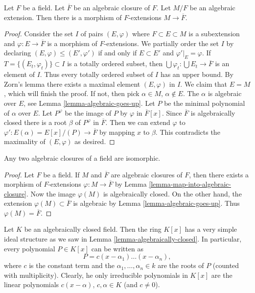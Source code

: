 \begin{lemma}
\label{lemma-map-into-algebraic-closure}
Let $F$ be a field. Let $\overline{F}$ be an algebraic closure of $F$.
Let $M/F$ be an algebraic extension. Then there is a morphism of
$F$-extensions $M \to \overline{F}$.
\end{lemma}

\begin{proof}
Consider the set $I$ of pairs $(E, \varphi)$ where $F \subset E \subset M$
is a subextension and $\varphi : E \to \overline{F}$ is a morphism of
$F$-extensions. We partially order the set $I$ by declaring
$(E, \varphi) \leq (E', \varphi')$ if and only if $E \subset E'$ and
$\varphi'|_E = \varphi$. If $T = \{(E_t,  \varphi_t)\} \subset I$
is a totally ordered subset, then
$\bigcup \varphi_t : \bigcup E_t \to \overline{F}$ is an element of $I$.
Thus every totally ordered subset of $I$ has an upper bound.
By Zorn's lemma there exists a maximal element $(E, \varphi)$ in $I$.
We claim that $E = M$, which will finish the proof. If not, then
pick $\alpha \in M$, $\alpha \not \in E$. The $\alpha$ is algebraic
over $E$, see Lemma \ref{lemma-algebraic-goes-up}.
Let $P$ be the minimal polynomial of $\alpha$ over $E$.
Let $P^\varphi$ be the image of $P$ by $\varphi$ in $\overline{F}[x]$.
Since $\overline{F}$ is algebraically closed there is a root $\beta$
of $P^\varphi$ in $\overline{F}$. Then we can extend $\varphi$ to
$\varphi' : E(\alpha) = E[x]/(P) \to \overline{F}$ by mapping
$x$ to $\beta$. This contradicts the maximality of $(E, \varphi)$
as desired.
\end{proof}

\begin{lemma}
\label{lemma-algebraic-closures-isomorphic}
Any two algebraic closures of a field are isomorphic.
\end{lemma}

\begin{proof}
Let $F$ be a field. If $M$ and $\overline{F}$ are algebraic closures of
$F$, then there exists a morphism of $F$-extensions
$\varphi : M \to \overline{F}$ by
Lemma \ref{lemma-map-into-algebraic-closure}.
Now the image $\varphi(M)$ is algebraically closed.
On the other hand, the extension $\varphi(M) \subset \overline{F}$
is algebraic by Lemma \ref{lemma-algebraic-goes-up}.
Thus $\varphi(M) = \overline{F}$.
\end{proof}

\noindent
Let $K$ be an algebraically closed field. Then the ring $K[x]$ has a very
simple ideal structure as we saw in Lemma \ref{lemma-algebraically-closed}.
In particular, every polynomial $P \in K[x]$ can be written as
$$
P = c(x - \alpha_1) \ldots (x - \alpha_n),
$$
where $c$ is the constant term and the $\alpha_1, \ldots, \alpha_n \in k$
are the roots of $P$ (counted with multiplicity). Clearly, he only irreducible
polynomials in $K[x]$ are the linear polynomials $c(x - \alpha)$,
$c, \alpha \in K$ (and $c \neq 0$).

